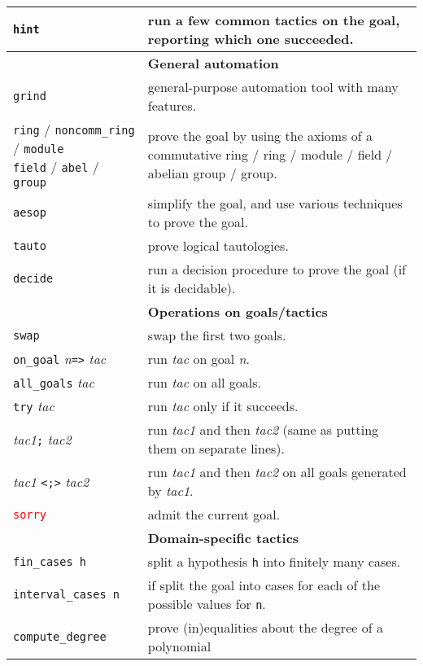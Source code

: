 \documentclass[a4paper]{article}
\newcommand{\lean}[1]{{\tt #1}}
\newcommand{\tactic}[1][]{\textit{tac#1}\xspace} %
\newcommand{\nat}{\textit{n}\xspace}
\begin{document}
\begin{center}
\begin{longtable}{@{}lp{113mm}@{}}
  \lean{hint} & run a few common tactics on the goal, reporting which one succeeded. \\
  \hline
  &\textbf{General automation}\\
  \lean{grind} & general-purpose automation tool with many features. \\
  \makecell[lt]{\lean{ring} / \lean{noncomm\_ring} / \lean{module} \\ \lean{field} / \lean{abel} / \lean{group}} & prove the goal by using the axioms of a commutative ring / ring / module / field / abelian group / group. \\
  \lean{aesop} & simplify the goal, and use various techniques to prove the goal. \\
  \lean{tauto} & prove logical tautologies. \\
  \lean{decide} & run a decision procedure to prove the goal (if it is decidable). \\
  \hline
  &\textbf{Operations on goals/tactics}\\
  \lean{swap} & swap the first two goals. \\
  \lean{on\_goal} \nat \lean{=>} \tactic & run \tactic on goal \nat. \\
  \lean{all\_goals} \tactic & run \tactic on all goals. \\
  \lean{try} \tactic & run \tactic only if it succeeds. \\
  \tactic[1]\lean{;} \tactic[2] & run \tactic[1] and then \tactic[2] (same as putting them on separate lines). \\
  \tactic[1] \lean{<;>} \tactic[2] & run \tactic[1] and then \tactic[2] on all goals generated by \tactic[1]. \\
  \textcolor{red}{\lean{sorry}} & admit the current goal.\\
  \hline
  &\textbf{Domain-specific tactics}\\
  \lean{fin\_cases h} & split a hypothesis \lean{h} into finitely many cases. \\
  \lean{interval\_cases n} & if split the goal into cases for each of the possible values for \lean{n}.\\
  \lean{compute\_degree} & prove (in)equalities about the degree of a polynomial \\

\end{longtable}
\end{center}
\end{document}
